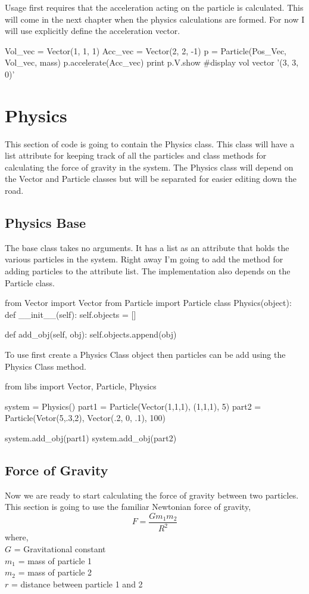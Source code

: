 \documentclass[15pt]{report}
\begin{document}
Usage first requires that the acceleration acting on the particle is calculated. This will come in the next chapter when the physics calculations are formed. For now I will use explicitly define the acceleration vector.

\begin{code}
Vol_vec = Vector(1, 1, 1)
Acc_vec = Vector(2, 2, -1)
p = Particle(Pos_Vec, Vol_vec, mass)
p.accelerate(Acc_vec)
print p.V.show		#display vol vector
'(3, 3, 0)'
\end{code}

\section{Physics}
This section of code is going to contain the Physics class. This class will have a list attribute for keeping track of all the particles and class methods for calculating the force of gravity in the system. The Physics class will depend on the Vector and Particle classes but will be separated for easier editing down the road.
\subsection{Physics Base} The base class takes no arguments. It has a list as an attribute that holds the various particles in the system. Right away I'm going to add the method for adding particles to the attribute list. The implementation also depends on the Particle class.

\begin{code}
from Vector import Vector
from Particle import Particle
class Physics(object):
    def __init__(self):
        self.objects = []
        
    def add_obj(self, obj):
        self.objects.append(obj)
\end{code}
 
To use first create a Physics Class object then particles can be add using the Physics Class method. 

\begin{code}
from libs import Vector, Particle, Physics

system = Physics()
part1 = Particle(Vector(1,1,1), (1,1,1), 5)
part2 = Particle(Vetor(5,.3,2), Vector(.2, 0, .1), 100)

system.add_obj(part1)
system.add_obj(part2)

\end{code}

\subsection{Force of Gravity}
Now we are ready to start calculating the force of gravity between two particles. This section is going to use the familiar Newtonian force of gravity,
\begin{equation} \label{grav}
F = \frac{G m_1 m_2}{R^2} 
\end{equation}
where, \\
$G$ = Gravitational constant \\
$m_1$ = mass of particle 1 \\
$m_2$ = mass of particle 2 \\
$r$ = distance between particle 1 and 2
\end{document}
